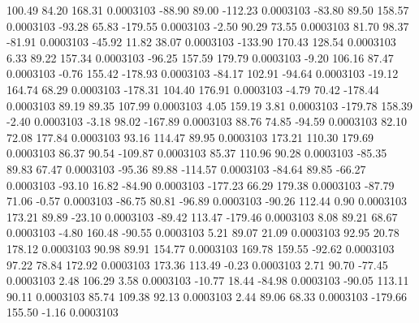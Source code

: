       100.49       84.20      168.31     0.0003103
      -88.90       89.00     -112.23     0.0003103
      -83.80       89.50      158.57     0.0003103
      -93.28       65.83     -179.55     0.0003103
       -2.50       90.29       73.55     0.0003103
       81.70       98.37      -81.91     0.0003103
      -45.92       11.82       38.07     0.0003103
     -133.90      170.43      128.54     0.0003103
        6.33       89.22      157.34     0.0003103
      -96.25      157.59      179.79     0.0003103
       -9.20      106.16       87.47     0.0003103
       -0.76      155.42     -178.93     0.0003103
      -84.17      102.91      -94.64     0.0003103
      -19.12      164.74       68.29     0.0003103
     -178.31      104.40      176.91     0.0003103
       -4.79       70.42     -178.44     0.0003103
       89.19       89.35      107.99     0.0003103
        4.05      159.19        3.81     0.0003103
     -179.78      158.39       -2.40     0.0003103
       -3.18       98.02     -167.89     0.0003103
       88.76       74.85      -94.59     0.0003103
       82.10       72.08      177.84     0.0003103
       93.16      114.47       89.95     0.0003103
      173.21      110.30      179.69     0.0003103
       86.37       90.54     -109.87     0.0003103
       85.37      110.96       90.28     0.0003103
      -85.35       89.83       67.47     0.0003103
      -95.36       89.88     -114.57     0.0003103
      -84.64       89.85      -66.27     0.0003103
      -93.10       16.82      -84.90     0.0003103
     -177.23       66.29      179.38     0.0003103
      -87.79       71.06       -0.57     0.0003103
      -86.75       80.81      -96.89     0.0003103
      -90.26      112.44        0.90     0.0003103
      173.21       89.89      -23.10     0.0003103
      -89.42      113.47     -179.46     0.0003103
        8.08       89.21       68.67     0.0003103
       -4.80      160.48      -90.55     0.0003103
        5.21       89.07       21.09     0.0003103
       92.95       20.78      178.12     0.0003103
       90.98       89.91      154.77     0.0003103
      169.78      159.55      -92.62     0.0003103
       97.22       78.84      172.92     0.0003103
      173.36      113.49       -0.23     0.0003103
        2.71       90.70      -77.45     0.0003103
        2.48      106.29        3.58     0.0003103
      -10.77       18.44      -84.98     0.0003103
      -90.05      113.11       90.11     0.0003103
       85.74      109.38       92.13     0.0003103
        2.44       89.06       68.33     0.0003103
     -179.66      155.50       -1.16     0.0003103
